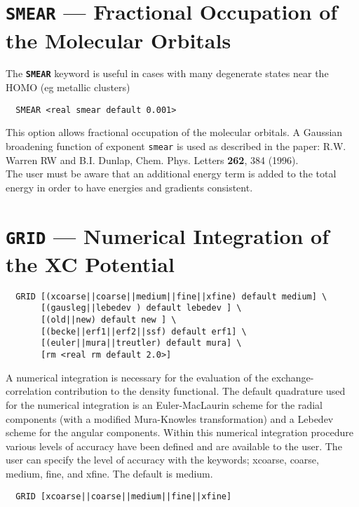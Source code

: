 \section{{\tt SMEAR} --- Fractional Occupation of the Molecular Orbitals}
\label{smear}

The {\tt \bf SMEAR} keyword is useful in cases with many degenerate states
near the HOMO (eg metallic clusters)

\begin{verbatim}
  SMEAR <real smear default 0.001>
\end{verbatim}

This  option allows fractional occupation of the molecular orbitals.
A Gaussian broadening function of exponent {\tt smear} is used as described in 
the paper:
R.W. Warren RW and B.I. Dunlap, Chem. Phys. Letters {\bf 262}, 384 (1996).\\
The user must be aware that an additional energy term is added to the total
energy in order to have
energies and gradients consistent.


\section{{\tt GRID} --- Numerical Integration of the XC Potential}
\label{grgrid}
\begin{verbatim}
  GRID [(xcoarse||coarse||medium||fine||xfine) default medium] \
       [(gausleg||lebedev ) default lebedev ] \
       [(old||new) default new ] \
       [(becke||erf1||erf2||ssf) default erf1] \
       [(euler||mura||treutler) default mura] \
       [rm <real rm default 2.0>]
\end{verbatim}

A numerical integration is necessary for the evaluation of the
exchange-correlation contribution to the density functional.  The
default quadrature used for the numerical integration is an
Euler-MacLaurin scheme for the radial components (with a modified
Mura-Knowles transformation)
and a Lebedev
scheme for the angular components.  Within this numerical
integration procedure various levels of accuracy have been defined and
are available to the user.  The user can specify the level of accuracy
with the keywords; xcoarse, coarse, medium, fine, and xfine.  The
default is medium.

\begin{verbatim}
  GRID [xcoarse||coarse||medium||fine||xfine]
\end{verbatim}

